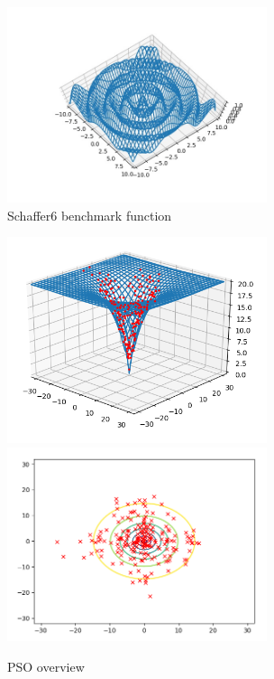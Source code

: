 \documentclass[journal]{IEEEtran}
\begin{document}
\begin{enumerate}
    \begin{figure}[H]
    \centering
    \includegraphics[width=3.0in]{_img/img_bmfunction_schafferfcn6.jpeg}
    \caption{Schaffer6 benchmark function}
    \end{figure}

\end{enumerate}

\begin{figure}
\centering
\includegraphics[width=3.0in]{_img/img_PSO_test_2d_ackley_3dview.png}
\includegraphics[width=3.0in]{_img/img_PSO_test_2d_ackley_contours.png}
\caption{PSO overview}
\end{figure}
\end{document}
